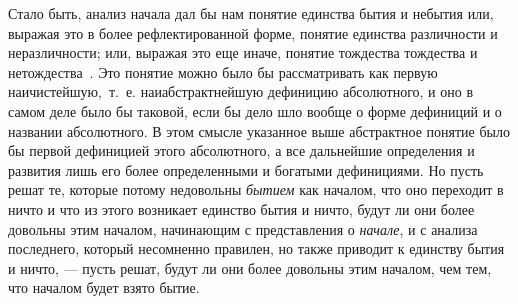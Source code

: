 Стало быть, анализ начала дал бы нам понятие единства бытия и небытия или,
выражая это в более рефлектированной форме, понятие единства различности и
неразличности; или, выражая это еще иначе, понятие тождества тождества и
нетождества~.
Это понятие можно было бы рассматривать как первую наичистейшую,~т.~е.
наиабстрактнейшую дефиницию абсолютного, и оно в самом деле было бы
таковой, если бы дело шло вообще о форме дефиниций и о названии
абсолютного. В этом смысле указанное выше абстрактное понятие было бы
первой дефиницией этого абсолютного, а все дальнейшие определения и
развития лишь его более определенными и богатыми дефинициями. Но пусть
решат те, которые потому недовольны {\em бытием} как
началом, что оно переходит в ничто и что из этого возникает единство бытия
и ничто, будут ли они более довольны этим началом, начинающим с
представления о {\em начале}, и с анализа последнего,
который несомненно правилен, но также приводит к единству бытия и ничто, —
пусть решат, будут ли они более довольны этим началом, чем тем, что началом
будет взято бытие.

